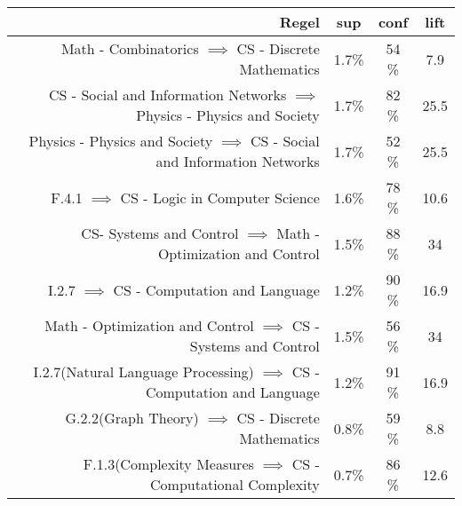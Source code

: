 	\begin{tabular}{rccc}
		\tiny \textbf{Regel} &\tiny \textbf{sup} &\tiny \textbf{conf} &\tiny \textbf{lift}\\
		\hline
		\tiny Math - Combinatorics $\implies$ CS - Discrete Mathematics  &\tiny 1.7\% &\tiny 54 \% &\tiny 7.9 \\
		\tiny CS - Social and Information Networks $\implies$ Physics - Physics and Society &\tiny 1.7\% &\tiny 82 \% &\tiny 25.5 \\
		\tiny Physics - Physics and Society $\implies$ CS - Social and Information Networks &\tiny 1.7\% &\tiny 52 \% &\tiny 25.5 \\
		\tiny F.4.1 $\implies$ CS - Logic in Computer Science &\tiny 1.6\% &\tiny 78 \% &\tiny 10.6 \\
		\tiny CS- Systems and Control $\implies$ Math - Optimization and Control &\tiny 1.5\% &\tiny 88 \% &\tiny 34 \\
		\tiny I.2.7 $\implies$ CS - Computation and Language &\tiny 1.2\% &\tiny 90 \% &\tiny 16.9 \\
		\tiny Math - Optimization and Control $\implies$ CS - Systems and Control  &\tiny 1.5\% &\tiny 56 \% &\tiny 34 \\

		\tiny I.2.7(Natural Language Processing)  $\implies$ CS - Computation and Language  &\tiny 1.2\% &\tiny 91 \% &\tiny 16.9 \\
		\tiny G.2.2(Graph Theory)   $\implies$ CS - Discrete Mathematics  &\tiny 0.8\% &\tiny 59 \% &\tiny 8.8 \\
		\tiny F.1.3(Complexity Measures  $\implies$ CS - Computational Complexity  &\tiny 0.7\% &\tiny 86 \% &\tiny 12.6 \\

	\end{tabular}
